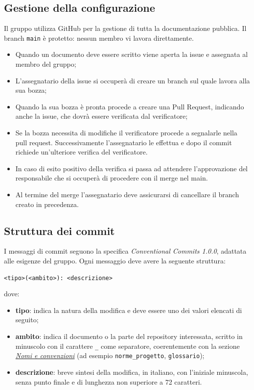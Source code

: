 \subsection{Gestione della configurazione}
Il gruppo utilizza GitHub per la gestione di tutta la documentazione pubblica. Il branch \texttt{main} è protetto: nessun membro vi lavora direttamente. 
\begin{itemize}
	\item Quando un documento deve essere scritto viene aperta la issue e assegnata al membro del gruppo;
	\item L'assegnatario della issue si occuperà di creare un branch sul quale lavora alla sua bozza;
	\item Quando la sua bozza è pronta procede a creare una Pull Request, indicando anche la issue, che dovrà essere verificata dal verificatore;
	\item Se la bozza necessita di modifiche il verificatore procede a segnalarle nella pull request. Successivamente l'assegnatario le effettua e dopo il commit richiede un'ulteriore verifica del verificatore.
	\item In caso di esito positivo della verifica si passa ad attendere l'approvazione del responsabile che si occuperà di procedere con il merge nel main.
	\item Al termine del merge l'assegnatario deve assicurarsi di cancellare il branch creato in precedenza.
\end{itemize}

\subsection{Struttura dei commit}\label{sec:commit}
I messaggi di commit seguono la specifica \textit{Conventional Commits 1.0.0},
adattata alle esigenze del gruppo. Ogni messaggio deve avere la seguente
struttura:
\begin{center}
  \texttt{<tipo>(<ambito>): <descrizione>}
\end{center}
dove:
\begin{itemize}
  \item \textbf{tipo}: indica la natura della modifica e deve essere uno
        dei valori elencati di seguito;
  \item \textbf{ambito}: indica il documento o la parte del repository
        interessata, scritto in minuscolo con il carattere \texttt{\_} come
        separatore, coerentemente con la sezione
        \hyperref[sec:nomi]{\textit{Nomi e convenzioni}}
        (ad esempio \texttt{norme\_progetto}, \texttt{glossario});
  \item \textbf{descrizione}: breve sintesi della modifica, in italiano,
        con l'iniziale minuscola, senza punto finale e di lunghezza non
        superiore a 72 caratteri.
\end{itemize}

